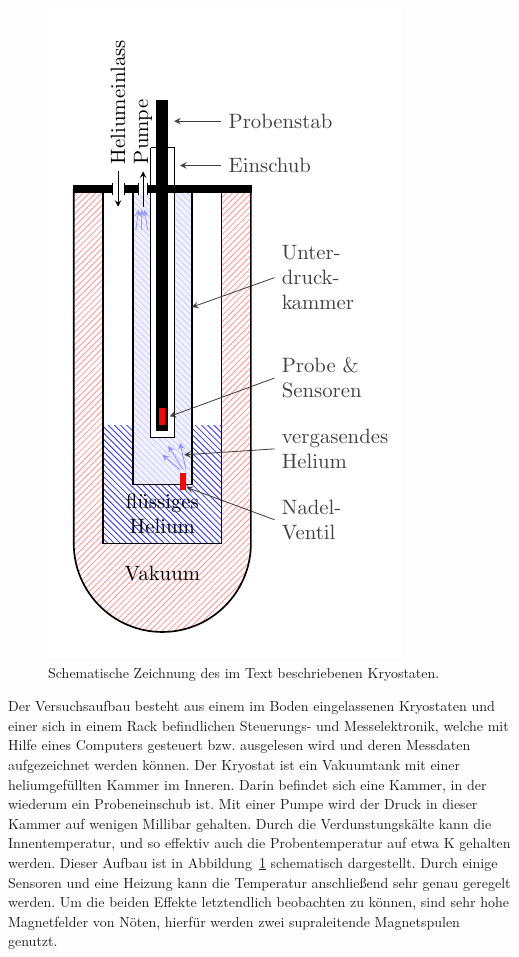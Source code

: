 \begin{figure}
		\centering
		\includegraphics[scale=1]{graphs/aufbau/tank.pdf}
		\caption[Schematischer Aufbau des Kryostaten]{Schematische Zeichnung des im Text beschriebenen Kryostaten.}
		\label{fig:kryo}
\end{figure}

Der Versuchsaufbau besteht aus einem im Boden eingelassenen Kryostaten und einer sich in einem Rack befindlichen Steuerungs- und Messelektronik, welche mit Hilfe eines Computers gesteuert bzw. ausgelesen wird und deren Messdaten aufgezeichnet werden können. Der Kryostat ist ein Vakuumtank mit einer heliumgefüllten Kammer im Inneren. Darin befindet sich eine Kammer, in der wiederum ein Probeneinschub ist. Mit einer Pumpe wird der Druck in dieser Kammer auf wenigen Millibar gehalten. Durch die Verdunstungskälte kann die Innentemperatur, und so effektiv auch die Probentemperatur auf etwa \unit[1,5]{K} gehalten werden. Dieser Aufbau ist in Abbildung~\ref{fig:kryo} schematisch dargestellt. Durch einige Sensoren und eine Heizung kann die Temperatur anschließend sehr genau geregelt werden. Um die beiden Effekte letztendlich beobachten zu können, sind sehr hohe Magnetfelder von Nöten, hierfür werden zwei supraleitende Magnetspulen genutzt.\\

